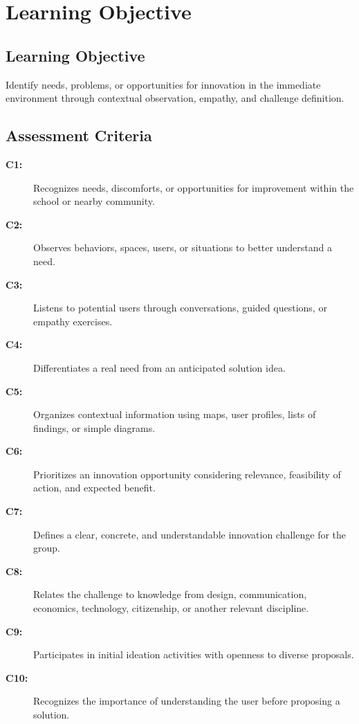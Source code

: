 \documentclass[12pt,a4paper]{article}
\newcommand{\criterio}[2]{
	\item[\textbf{#1:}] #2
}
\begin{document}
	
	\section{Learning Objective}
	
	\subsection*{Learning Objective}
	
	Identify needs, problems, or opportunities for innovation in the immediate environment through contextual observation, empathy, and challenge definition.
	
	\subsection*{Assessment Criteria}
	
	\begin{description}
		
		\criterio{C1}{
			Recognizes needs, discomforts, or opportunities for improvement
			within the school or nearby community.
		}
		
		\criterio{C2}{
			Observes behaviors, spaces, users, or situations to better
			understand a need.
		}
		
		\criterio{C3}{
			Listens to potential users through conversations, guided
			questions, or empathy exercises.
		}
		
		\criterio{C4}{
			Differentiates a real need from an anticipated solution idea.
		}
		
		\criterio{C5}{
			Organizes contextual information using maps, user profiles,
			lists of findings, or simple diagrams.
		}
		
		\criterio{C6}{
			Prioritizes an innovation opportunity considering relevance,
			feasibility of action, and expected benefit.
		}
		
		\criterio{C7}{
			Defines a clear, concrete, and understandable innovation
			challenge for the group.
		}
		
		\criterio{C8}{
			Relates the challenge to knowledge from design, communication,
			economics, technology, citizenship, or another relevant
			discipline.
		}
		
		\criterio{C9}{
			Participates in initial ideation activities with openness to
			diverse proposals.
		}
		
		\criterio{C10}{
			Recognizes the importance of understanding the user before
			proposing a solution.
		}
		
	\end{description}
	
\end{document}
